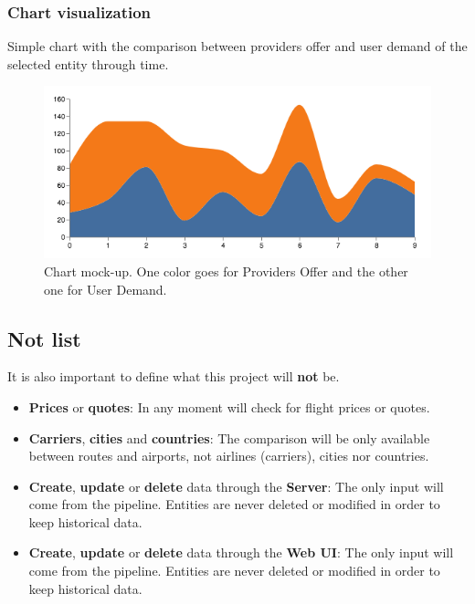 \subsubsection*{Chart visualization} \label{chart_visualization}

Simple chart with the comparison between providers offer and user demand of the selected entity through time.

\begin{figure}[H]
\centering
\includegraphics[scale=0.3]{resources/stacked-chart-example01.png}
\caption{Chart mock-up. One color goes for Providers Offer and the other one for User Demand.}
\end{figure}

\subsection{Not list}

It is also important to define what this project will \textbf{not} be.

\begin{itemize}
  \item \textbf{Prices} or \textbf{quotes}: In any moment will check for flight prices or quotes.
  \item \textbf{Carriers}, \textbf{cities} and \textbf{countries}: The comparison will be only available between routes and airports, not airlines (carriers), cities nor countries.
  \item \textbf{Create}, \textbf{update} or \textbf{delete} data through the \textbf{Server}: The only input will come from the pipeline. Entities are never deleted or modified in order to keep historical data.
  \item \textbf{Create}, \textbf{update} or \textbf{delete} data through the \textbf{Web UI}: The only input will come from the pipeline. Entities are never deleted or modified in order to keep historical data.
\end{itemize}

